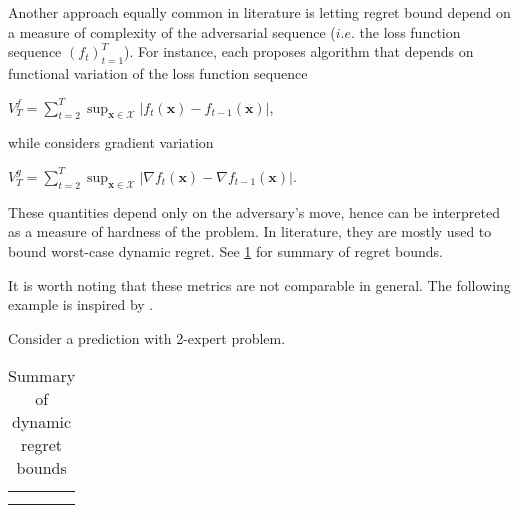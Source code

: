 \documentclass[12pt, a4paper]{report}
\begin{document}
Another approach equally common in literature is letting regret bound depend on a measure of complexity of the adversarial sequence ($i.e.$ the loss function sequence $(f_t)_{t=1}^T$). 
For instance, \cite{Besbes2015Nonstationary, Jadbabaie2015OnlineO, Yang2016TrackingSM} each proposes algorithm that depends on functional variation of the loss function sequence
\begin{center}
    $\displaystyle V_T^f = \sum_{t=2}^T \sup_{\mathbf{x} \in \mathcal{X}} | f_t(\mathbf{x}) - f_{t-1}(\mathbf{x})|$,
\end{center}
while \cite{Chiang2013BeatingBI} considers gradient variation
\begin{center}
    $\displaystyle V_T^g = \sum_{t=2}^T \sup_{\mathbf{x} \in \mathcal{X}} | \nabla f_t(\mathbf{x}) - \nabla f_{t-1}(\mathbf{x})|$.
\end{center}
These quantities depend only on the adversary's move, hence can be interpreted as a measure of hardness of the problem. In literature, they are mostly used to bound worst-case dynamic regret. See \ref{table:metric} for summary of regret bounds.

It is worth noting that these metrics are not comparable in general. The following example is inspired by \cite{Jadbabaie2015OnlineO}.
\begin{exmp}
Consider a prediction with 2-expert problem. 
\end{exmp}
\begin{table}[h]
    \centering
    \small
    \begin{tabular}{c|c}
         &  \\
         & 
    \end{tabular}
    \caption{Summary of dynamic regret bounds}
    \label{table:metric}
\end{table}
\end{document}

